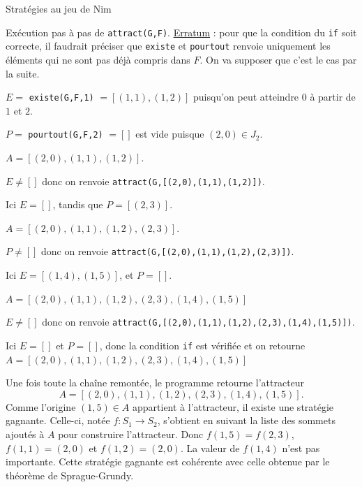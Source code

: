 \begin{exo}[PC][1][TD]{Stratégies au jeu de Nim}
\begin{quest}
{Exécution pas à pas de \texttt{attract(G,F)}.
    \underline{Erratum} : pour que la condition du \texttt{if} soit correcte, il faudrait préciser que \texttt{existe} et \texttt{pourtout} renvoie uniquement les éléments qui ne sont pas déjà compris dans $F$. On va supposer que c’est le cas par la suite.
\begin{liste}
  \item $E =$ \texttt{existe(G,F,1)} $= [(1,1),(1,2)]$ puisqu’on peut atteindre $0$ à partir de $1$ et $2$.
  \item $P =$ \texttt{pourtout(G,F,2)} $= []$
  est vide puisque $(2,0) \in J_2$.
  \item $A = [(2,0),(1,1),(1,2)]$.
  \item $E \neq []$ donc on renvoie \texttt{attract(G,[(2,0),(1,1),(1,2)])}.
  \begin{liste}
    \item Ici $E = []$, tandis que $P = [(2,3)]$.
    \item $A = [(2,0),(1,1),(1,2),(2,3)]$.
    \item $P \neq []$ donc on renvoie \texttt{attract(G,[(2,0),(1,1),(1,2),(2,3)])}.
    \begin{liste}
      \item Ici $E = [(1,4),(1,5)]$, et $P = []$.
      \item $A = [(2,0),(1,1),(1,2),(2,3),(1,4),(1,5)]$
      \item $E \neq []$ donc on renvoie \texttt{attract(G,[(2,0),(1,1),(1,2),(2,3),(1,4),(1,5)])}.
      \begin{liste}
        \item Ici $E = []$ et $P = []$, donc la condition \texttt{if} est vérifiée et on retourne $A = [(2,0),(1,1),(1,2),(2,3),(1,4),(1,5)]$
      \end{liste}
    \end{liste}
  \end{liste}
\end{liste}
Une fois toute la chaîne remontée, le programme retourne l’attracteur
$$
A = [(2,0),(1,1),(1,2),(2,3),(1,4),(1,5)].
$$
Comme l’origine $(1,5) \in A$ appartient à l’attracteur, il existe une stratégie gagnante. Celle-ci, notée $f : S_1 \rightarrow S_2$, s’obtient en suivant la liste des sommets ajoutés à $A$ pour construire l’attracteur. Donc $f(1,5) = f(2,3)$, $f(1,1)=(2,0)$ et $f(1,2)=(2,0)$. La valeur de $f(1,4)$ n’est pas importante. Cette stratégie gagnante est cohérente avec celle obtenue par le théorème de Sprague-Grundy.
}
\end{quest}
\end{exo}

